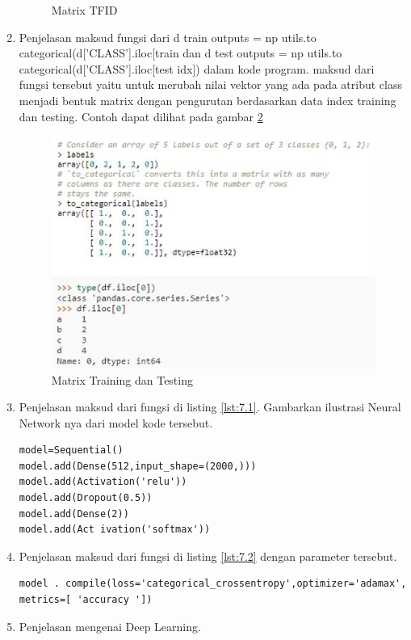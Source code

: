 \begin{enumerate}
\begin{figure}[!htbp]
\caption{Matrix TFID}
\label{c7t_4}
\end{figure}
\item Penjelasan maksud fungsi dari d train outputs = np utils.to categorical(d['CLASS'].iloc[train dan d test outputs = np utils.to categorical(d['CLASS'].iloc[test idx]) dalam kode program.
\subitem maksud dari fungsi tersebut yaitu untuk merubah nilai vektor yang ada pada atribut class menjadi bentuk matrix dengan pengurutan berdasarkan data index training dan testing. Contoh dapat dilihat pada gambar \ref{c7t_5}
\begin{figure}[!htbp]
\centerline{\includegraphics[width=1\textwidth]{figures/c7t/5.JPG}}
\caption{Matrix Training dan Testing}
\label{c7t_5}
\end{figure}
\item Penjelasan maksud dari fungsi di listing \ref{lst:7.1}. Gambarkan ilustrasi Neural Network nya dari model kode tersebut.
\begin{lstlisting}[caption=Neural Network,label={lst:7.1}]
model=Sequential()
model.add(Dense(512,input_shape=(2000,)))
model.add(Activation('relu'))
model.add(Dropout(0.5))
model.add(Dense(2))
model.add(Act ivation('softmax'))
\end{lstlisting}
\item Penjelasan maksud dari fungsi di listing \ref{lst:7.2} dengan parameter tersebut.
\begin{lstlisting}[caption=Model Compile Metric,label={lst:7.2}]
model . compile(loss='categorical_crossentropy',optimizer='adamax',
metrics=[ 'accuracy '])
\end{lstlisting}
\item Penjelasan mengenai Deep Learning.

\end{enumerate}
